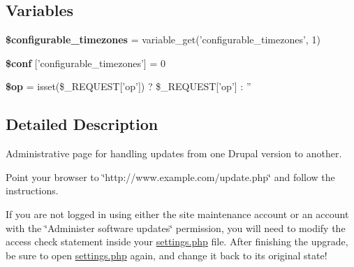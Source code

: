 \subsection*{Variables}
\begin{DoxyCompactItemize}
\item 
\hypertarget{update_8php_aca9c354df68bb31220cc03554e597cb2}{
{\bfseries \$configurable\_\-timezones} = variable\_\-get('configurable\_\-timezones', 1)}
\label{update_8php_aca9c354df68bb31220cc03554e597cb2}

\item 
\hypertarget{update_8php_a1ba16a3107f57e46adfac38b626ec551}{
{\bfseries \$conf} \mbox{[}'configurable\_\-timezones'\mbox{]} = 0}
\label{update_8php_a1ba16a3107f57e46adfac38b626ec551}

\item 
\hypertarget{update_8php_a7c93a81c9b28ec2f78f33cdabda28c76}{
{\bfseries \$op} = isset(\$\_\-REQUEST\mbox{[}'op'\mbox{]}) ? \$\_\-REQUEST\mbox{[}'op'\mbox{]} : ''}
\label{update_8php_a7c93a81c9b28ec2f78f33cdabda28c76}

\end{DoxyCompactItemize}


\subsection{Detailed Description}
Administrative page for handling updates from one Drupal version to another.

Point your browser to \char`\"{}http://www.example.com/update.php\char`\"{} and follow the instructions.

If you are not logged in using either the site maintenance account or an account with the \char`\"{}Administer software updates\char`\"{} permission, you will need to modify the access check statement inside your \hyperlink{settings_8php}{settings.php} file. After finishing the upgrade, be sure to open \hyperlink{settings_8php}{settings.php} again, and change it back to its original state! 

